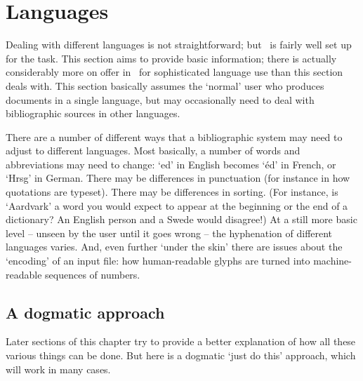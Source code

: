 \chapter{Languages}\label{ch:languages}

Dealing with different languages is not straightforward; but
\biblatex\ is fairly well set up for the task. This section aims to
provide basic information; there is actually considerably more on
offer in \biblatex\ for sophisticated language use than this section
deals with. This section basically assumes the `normal' user who
produces documents in a single language, but may occasionally need to
deal with bibliographic sources in other languages.

There are a number of different ways that a bibliographic system may
need to adjust to different languages. Most basically, a number of
words and abbreviations may need to change: `ed' in English becomes
`éd' in French, or `Hrsg' in German. There may be differences in
punctuation (for instance in how quotations are typeset). There may be
differences in sorting. (For instance, is `Aardvark' a word you would
expect to appear at the beginning or the end of a dictionary? An
English person and a Swede would disagree!) At a still more basic
level -- unseen by the user until it goes wrong -- the hyphenation of
different languages varies. And, even further `under the skin' there
are issues about the `encoding' of an input file: how human-readable
glyphs are turned into machine-readable sequences of numbers.

\section{A dogmatic approach}

Later sections of this chapter try to provide a better explanation of
how all these various things can be done. But here is a dogmatic `just
do this' approach, which will work in many cases.

